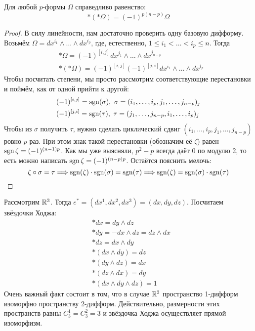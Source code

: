\begin{proposition}
	Для любой $p$-формы $\Omega$ справедливо равенство:
	\[
		*(*\Omega) = (-1)^{p(n - p)}\Omega
	\]
\end{proposition}

\begin{proof}
	В силу линейности, нам достаточно проверить одну базовую дифформу. Возьмём $\Omega = dx^{i_1} \wedge \ldots \wedge dx^{i_p}$, где, естественно, $1 \le i_1 < \ldots < i_p \le n$. Тогда
	\begin{align*}
		&{*\Omega = (-1)^{[i, j]} dx^{j_1} \wedge \ldots \wedge dx^{j_{n - p}}}
		\\
		&{*(*\Omega) = (-1)^{[i, j]} (-1)^{[j, i]} dx^{i_1} \wedge \ldots \wedge dx^{i_p}}
	\end{align*}
	Чтобы посчитать степени, мы просто рассмотрим соответствующие перестановки и поймём, как от одной прийти к другой:
	\begin{align*}
		&{(-1)^{[i, j]} = \operatorname{sgn}(\sigma),\ \sigma = (i_1, \ldots, i_p, j_1, \ldots, j_{n - p})_j}
		\\
		&{(-1)^{[j, i]} = \operatorname{sgn}(\tau),\ \tau = (j_1, \ldots, j_{n - p}, i_1, \ldots, i_p)_j}
	\end{align*}
	Чтобы из $\sigma$ получить $\tau$, нужно сделать циклический сдвиг $(i_1, \ldots, i_p, j_1, \ldots, j_{n - p})$ ровно $p$ раз. При этом знак такой перестановки (обозначим её $\zeta$) равен $\operatorname{sgn} \zeta = (-1)^{(n - 1)p}$. Как мы уже выясняли, $p^2 - p$ всегда даёт 0 по модулю 2, то есть можно написать $\operatorname{sgn} \zeta = (-1)^{(n - p)p}$. Остаётся пояснить мелочь:
	\[
		\zeta \circ \sigma = \tau \Longrightarrow \operatorname{sgn}(\zeta) \cdot \operatorname{sgn}(\sigma) = \operatorname{sgn}(\tau) \Longrightarrow \operatorname{sgn}(\zeta) = \operatorname{sgn}(\sigma) \cdot \operatorname{sgn}(\tau)
	\]
\end{proof}

\begin{example}
	Рассмотрим $\mathbb{R}^3$. Тогда $e^* = (dx^1, dx^2, dx^3) = (dx, dy, dz)$. Посчитаем звёздочки Ходжа:
	\begin{align*}
	&{*dx = dy \wedge dz}
	\\
	&{*dy = -dx \wedge dz = dz \wedge dx}
	\\
	&{*dz = dx \wedge dy}
	\\
	&{*(dx \wedge dy) = dz}
	\\
	&{*(dy \wedge dz) = dx}
	\\
	&{*(dz \wedge dx) = dy}
	\\
	&{*(dx \wedge dy \wedge dz) = 1}
	\end{align*}
	Очень важный факт состоит в том, что в случае $\mathbb{R}^3$ пространство 1-дифформ изоморфно пространству 2-дифформ. Действительно, размерности этих пространств равны $C_3^1 = C_3^2 = 3$ и звёздочка Ходжа осуществляет прямой изоморфизм.
\end{example}

